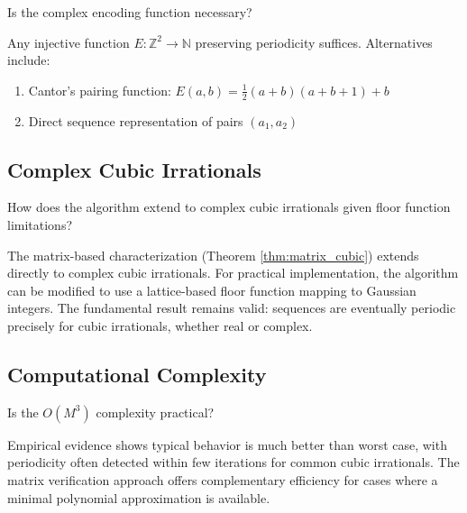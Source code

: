 \begin{objection}
Is the complex encoding function necessary?
\end{objection}

\begin{response}
Any injective function $E: \mathbb{Z}^2 \to \mathbb{N}$ preserving periodicity suffices. Alternatives include:
\begin{enumerate}
\item Cantor's pairing function: $E(a,b) = \frac{1}{2}(a+b)(a+b+1) + b$
\item Direct sequence representation of pairs $(a_1, a_2)$
\end{enumerate}
\end{response}

\subsection{Complex Cubic Irrationals}

\begin{objection}
How does the algorithm extend to complex cubic irrationals given floor function limitations?
\end{objection}

\begin{response}
The matrix-based characterization (Theorem \ref{thm:matrix_cubic}) extends directly to complex cubic irrationals. For practical implementation, the \HAPD{} algorithm can be modified to use a lattice-based floor function mapping to Gaussian integers. The fundamental result remains valid: sequences are eventually periodic precisely for cubic irrationals, whether real or complex.
\end{response}

\subsection{Computational Complexity}

\begin{objection}
Is the $O(M^3)$ complexity practical?
\end{objection}

\begin{response}
Empirical evidence shows typical behavior is much better than worst case, with periodicity often detected within few iterations for common cubic irrationals. The matrix verification approach offers complementary efficiency for cases where a minimal polynomial approximation is available.
\end{response}

